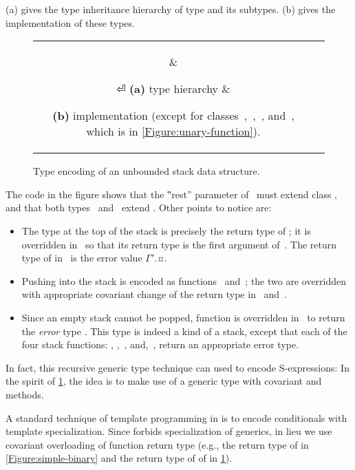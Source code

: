 (a) gives the type inheritance hierarchy 
of type  and its subtypes.
(b)
gives the implementation of these types.

\begin{figure}[!htb]
  \caption{Type encoding of an unbounded stack data structure.}
  \label{Figure:stack-encoding}
  \begin{tabular}{cc}
    \parbox[c]{0.3\linewidth}{%
      
    } &
    \hspace{-3ex} \parbox[c]{63ex}{}⏎
    \textbf{(a)} type hierarchy &
    \hspace{-3ex} \parbox[t]{63ex}{%
    \textbf{(b)} implementation (except
    for classes~,~,~, and~, which is in \cref{Figure:unary-function}).}
  \end{tabular}
\end{figure}

The code in the figure shows that the ‟rest” parameter of~ must extend class ,
  and that both types~ and~ extend .
Other points to notice are:
\begin{itemize}
  \item The type at the top of the stack is precisely the return type of ;
        it is overridden in~ so that its return type is the first argument of~.
        The return type of  in~ is the error value {$Γ'$.¤}.
  \item Pushing into the stack is encoded as functions~ and~;
        the two are overridden with appropriate covariant change of the return type in~ and~.
  \item Since an empty stack cannot be popped, function  is overridden in~ to return
    the \emph{error} type . This type is indeed a kind of a stack, except that each of the four stack
        functions: , ,~, and,~, return an appropriate error type.
\end{itemize}
In fact, this recursive generic type technique can used to encode S-expressions: In the spirit of
  \cref{Figure:stack-encoding}, the idea is to make use of a  generic type
  with covariant  and  methods.

A standard technique of template programming in \CC is to encode conditionals with template specialization.
Since \Java forbids specialization of generics, in lieu we use covariant overloading of function
  return type (e.g., the return type of  in \cref{Figure:simple-binary} and the
  return type of of  in \cref{Figure:stack-encoding}).

